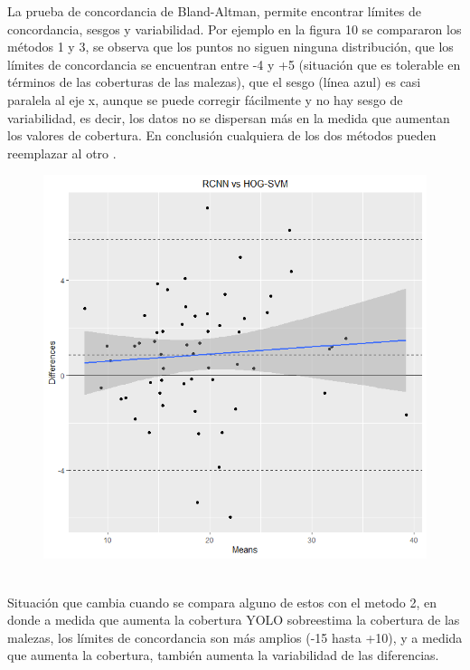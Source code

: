 \documentclass[journal,article,submit,moreauthors,pdftex]{Definitions/mdpi}
\begin{document}
La prueba de concordancia de Bland-Altman, permite encontrar límites de concordancia, sesgos y variabilidad. Por ejemplo en la figura 10 se compararon los métodos 1 y 3, se observa que los puntos no siguen ninguna distribución, que los límites de concordancia se encuentran entre -4 y +5 (situación que es tolerable en términos de las coberturas de las malezas), que el sesgo (línea azul) es casi paralela al eje x, aunque se puede corregir fácilmente y no hay sesgo de variabilidad, es decir, los datos no se dispersan más en la medida que aumentan los valores de cobertura. En conclusión cualquiera de los dos métodos pueden reemplazar al otro \cite{c59}.
\\
\begin{figure}[H]
    \centering
    \includegraphics[scale=0.4]{RCNN-HOG-SVM.png}
     \centering
    \caption{}
\end{figure}
\\
Situación que cambia cuando se compara alguno de estos con el metodo 2, en donde a medida que aumenta la cobertura YOLO sobreestima la cobertura de las malezas, los límites de concordancia son más amplios (-15 hasta +10), y a medida que aumenta la cobertura, también aumenta la variabilidad de las diferencias.
\end{document}
